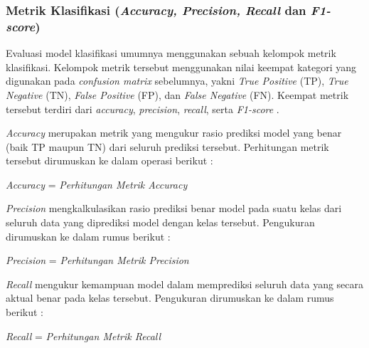 \subsubsection{Metrik Klasifikasi (\textit{Accuracy, Precision, Recall} dan \textit{F1-score})} \label{II.Teori11.2}
Evaluasi model klasifikasi umumnya menggunakan sebuah kelompok metrik klasifikasi.
Kelompok metrik tersebut menggunakan nilai keempat kategori yang digunakan pada \textit{confusion matrix} sebelumnya, yakni \textit{True Positive} (TP), \textit{True Negative} (TN), \textit{False Positive} (FP), dan \textit{False Negative} (FN).
Keempat metrik tersebut terdiri dari \textit{accuracy}, \textit{precision}, \textit{recall}, serta \textit{F1-score} \cite{fawcett2006introduction}. \par 

\textit{Accuracy} merupakan metrik yang mengukur rasio prediksi model yang benar (baik TP maupun TN) dari seluruh prediksi tersebut.
Perhitungan metrik tersebut dirumuskan ke dalam operasi berikut \cite{fawcett2006introduction}:

\begin{equationcaptioned}{
      \textit{Accuracy} = 
      \label{eq:accuracy}
  }{
      \textit{Perhitungan Metrik \textit{Accuracy}}
  }
  \end{equationcaptioned}
  \medskip

\textit{Precision} mengkalkulasikan rasio prediksi benar model pada suatu kelas dari seluruh data yang diprediksi model dengan kelas tersebut.
Pengukuran dirumuskan ke dalam rumus berikut \cite{powers2011evaluation}:

\begin{equationcaptioned}{
      \textit{Precision} = 
      \label{eq:precision}
  }{
      \textit{Perhitungan Metrik \textit{Precision}}
  }
  \end{equationcaptioned}
  \medskip

\textit{Recall} mengukur kemampuan model dalam memprediksi seluruh data yang secara aktual benar pada kelas tersebut. 
Pengukuran dirumuskan ke dalam rumus berikut \cite{powers2011evaluation}:

\begin{equationcaptioned}{
      \textit{Recall} = 
      \label{eq:recall}
  }{
      \textit{Perhitungan Metrik \textit{Recall}}
  }
  \end{equationcaptioned}
  \medskip

